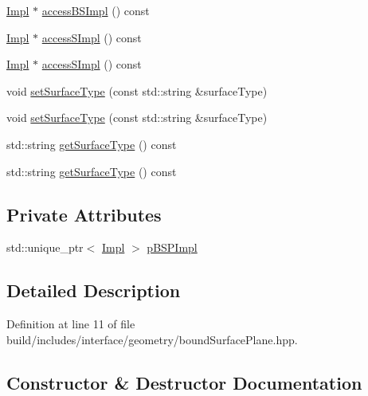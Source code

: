 \begin{DoxyCompactItemize}
\item 
\hyperlink{classMcCAD_1_1Geometry_1_1BoundSurfacePlane_1_1Impl}{Impl} $\ast$ \hyperlink{classMcCAD_1_1Geometry_1_1BoundSurface_a7b638aa31593926d6210aad6a30e1f47}{access\+B\+S\+Impl} () const
\item 
\hyperlink{classMcCAD_1_1Geometry_1_1BoundSurfacePlane_1_1Impl}{Impl} $\ast$ \hyperlink{classMcCAD_1_1Geometry_1_1Surface_a989de1f9ebe3de043412014ed25e52eb}{access\+S\+Impl} () const
\item 
\hyperlink{classMcCAD_1_1Geometry_1_1BoundSurfacePlane_1_1Impl}{Impl} $\ast$ \hyperlink{classMcCAD_1_1Geometry_1_1Surface_adafee834670eb8c97025e24ffd6df844}{access\+S\+Impl} () const
\item 
void \hyperlink{classMcCAD_1_1Geometry_1_1Surface_a976893834481e58569db0d35db2ba969}{set\+Surface\+Type} (const std\+::string \&surface\+Type)
\item 
void \hyperlink{classMcCAD_1_1Geometry_1_1Surface_a976893834481e58569db0d35db2ba969}{set\+Surface\+Type} (const std\+::string \&surface\+Type)
\item 
std\+::string \hyperlink{classMcCAD_1_1Geometry_1_1Surface_ac81308cae2d3fd458dfa311adea23688}{get\+Surface\+Type} () const
\item 
std\+::string \hyperlink{classMcCAD_1_1Geometry_1_1Surface_ac81308cae2d3fd458dfa311adea23688}{get\+Surface\+Type} () const
\end{DoxyCompactItemize}
\subsection*{Private Attributes}
\begin{DoxyCompactItemize}
\item 
std\+::unique\+\_\+ptr$<$ \hyperlink{classMcCAD_1_1Geometry_1_1BoundSurfacePlane_1_1Impl}{Impl} $>$ \hyperlink{classMcCAD_1_1Geometry_1_1BoundSurfacePlane_a4e6fab5cba3cc226ad29f679bd3886ce}{p\+B\+S\+P\+Impl}
\end{DoxyCompactItemize}


\subsection{Detailed Description}


Definition at line 11 of file build/includes/interface/geometry/bound\+Surface\+Plane.\+hpp.



\subsection{Constructor \& Destructor Documentation}
\mbox{\label{classMcCAD_1_1Geometry_1_1BoundSurfacePlane_aae9af5a7f31d48a6293c236525831587}} 
